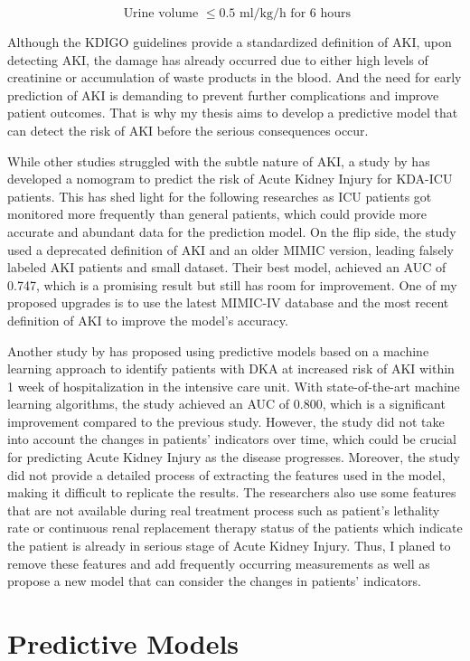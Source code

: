 \documentclass[../main.tex]{subfiles}
\begin{document}
\begin{equation}
    \text{ Urine volume } \le 0.5 \text{ ml/kg/h for 6 hours}
\end{equation}

Although the KDIGO guidelines provide a standardized definition of AKI, upon detecting AKI, the damage has already occurred due to either high levels of creatinine or accumulation of waste products in the blood.
And the need for early prediction of AKI is demanding to prevent further complications and improve patient outcomes.
That is why my thesis aims to develop a predictive model that can detect the risk of AKI before the serious consequences occur.

While other studies struggled with the subtle nature of AKI, a study by \cite{chen2021nomogram} has developed a nomogram to predict the risk of Acute Kidney Injury for KDA-ICU patients.
This has shed light for the following researches as ICU patients got monitored more frequently than general patients, which could provide more accurate and abundant data for the prediction model.
On the flip side, the study used a deprecated definition of AKI and an older MIMIC version, leading falsely labeled AKI patients and small dataset.
Their best model, achieved an AUC of 0.747, which is a promising result but still has room for improvement.
One of my proposed upgrades is to use the latest MIMIC-IV database and the most recent definition of AKI to improve the model's accuracy.

Another study by \cite{goceri2021predicting} has proposed using predictive models based on a machine learning approach to identify patients with DKA at increased risk of AKI within 1 week of hospitalization in the intensive care unit.
With state-of-the-art machine learning algorithms, the study achieved an AUC of 0.800, which is a significant improvement compared to the previous study.
However, the study did not take into account the changes in patients' indicators over time, which could be crucial for predicting Acute Kidney Injury as the disease progresses. 
Moreover, the study did not provide a detailed process of extracting the features used in the model, making it difficult to replicate the results.
The researchers also use some features that are not available during real treatment process such as patient's lethality rate or continuous renal replacement therapy status of the patients which indicate the patient is already in serious stage of Acute Kidney Injury.
Thus, I planed to remove these features and add frequently occurring measurements as well as propose a new model that can consider the changes in patients' indicators.


\section{Predictive Models}
\end{document}
